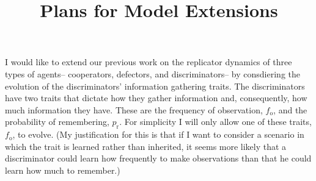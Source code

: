 \documentclass{article}
\begin{document}
\title{Plans for Model Extensions}
\maketitle

I would like to extend our previous work on the replicator dynamics of three types of agents-- cooperators, defectors, and discriminators-- by consdiering the evolution of the discriminators' information gathering traits.  The discriminators have two traits that dictate how they gather information and, consequently, how much information they have.  These are the frequency of observation, $f_\text{o}$, and the probability of remembering, $p_\text{r}$. For simplicity I will only allow one of these traits, $f_\text{o}$, to evolve.  (My justification for this is that if I want to consider a scenario in which the trait is learned rather than inherited, it seems more likely that a discriminator could learn how frequently to make observations than that he could learn how much to remember.)  
\end{document}
